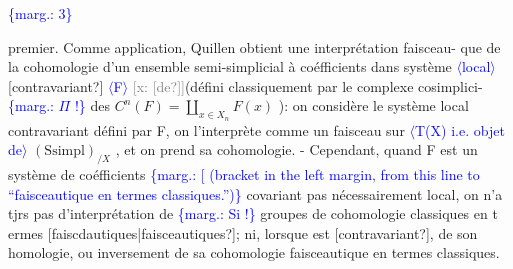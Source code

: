 \documentclass[11pt]{article}
\newcommand{\scanpage}[1]{\par\bigskip\noindent{\small\sffamily[scan #1]}\par}
\newcommand{\mspage}[1]{{\small\sffamily[p.\,#1]}}
\newcommand{\hand}[1]{\textcolor{blue}{#1}}
\newcommand{\inserted}[2][]{\textcolor{blue}{$\langle$#2$\rangle$}}
\newcommand{\margin}[1]{\textcolor{blue}{\{\textsf{marg.:} #1\}}}
\newcommand{\xout}[1]{\textcolor{gray}{[\textsf{x:} #1]}}
\newcommand{\unsure}[1]{[#1?]}
\begin{document}
\margin{\hand{3}}

\clearpage
\scanpage{162-5/4}
\mspage{\hand{3}}

premier. Comme application, Quillen obtient une interprétation faisceau-%
que de la cohomologie d'un ensemble semi-simplicial à coéfficients dans
système \inserted{local} \unsure{contravariant} \inserted{F} \xout{\unsure{de}}(défini classiquement par le complexe cosimplici-
\margin{$\Pi$ !} des $C^n(F) = \coprod_{x \in X_n} F(x)$ ): on considère le système local contravariant
défini par F, on l'interprète comme un faisceau sur \inserted[typed]{T(X) i.e. objet de} $(\mathrm{Ssimpl})_{/X}$ , et on
prend sa cohomologie. - Cependant, quand F est un système de coéfficients
\margin{[ (bracket in the left margin, from this line to ``faisceautique en termes classiques.'')} covariant pas nécessairement local, on n'a tjrs pas d'interprétation de
\margin{Si !} groupes de cohomologie classiques en t ermes \unsure{faiscdautiques|faisceautiques}; ni, lorsque
est \unsure{contravariant}, de son homologie, ou inversement de sa cohomologie
faisceautique en termes classiques.
\end{document}
